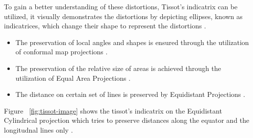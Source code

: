 To gain a better understanding of these distortions, Tissot's indicatrix can be utilized, it visually demonstrates the distortions by depicting ellipses, known as indicatrices, which change their shape to represent the distortions \cite{Snyder1982}.
\begin{itemize}
    \item The preservation of local angles and shapes is ensured through the utilization of conformal map projections \cite{GISGEO_Tissot}.
    \item The preservation of the relative size of areas is achieved through the utilization of Equal Area Projections \cite{GISGEO_Tissot}.
    \item The distance on certain set of lines is preserved by Equidistant Projections \cite{GISGEO_Tissot}.
\end{itemize}
Figure ~\ref{fig:tissot-image} shows the tissot's indicatrix on the Equidistant Cylindrical projection which tries to preserve distances along the equator and the longitudnal lines only \cite{GISGEO_Tissot}.
